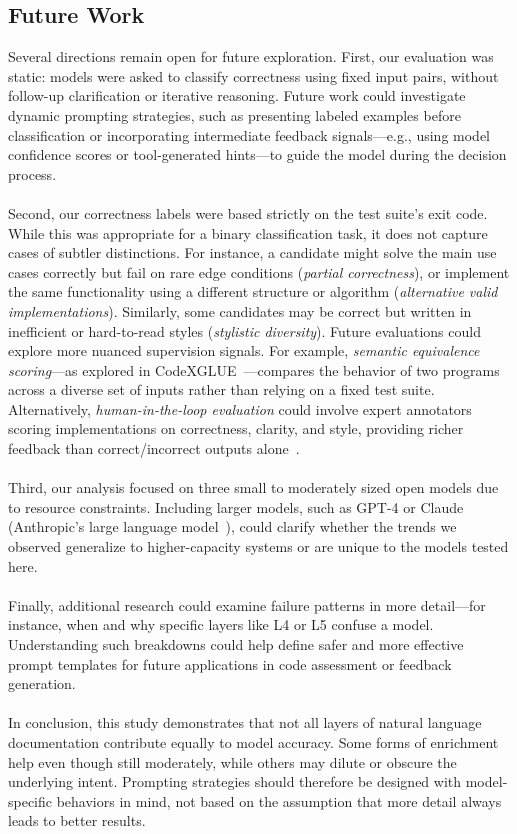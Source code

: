 \documentclass[a4paper]{usiinfbachelorproject}
\begin{document}
\subsection*{Future Work}
Several directions remain open for future exploration. First, our evaluation was static: models were asked to classify correctness using fixed input pairs, without follow-up clarification or iterative reasoning. Future work could investigate dynamic prompting strategies, such as presenting labeled examples before classification or incorporating intermediate feedback signals—e.g., using model confidence scores or tool-generated hints—to guide the model during the decision process. \\
\\
Second, our correctness labels were based strictly on the test suite’s exit code. While this was appropriate for a binary classification task, it does not capture cases of subtler distinctions. For instance, a candidate might solve the main use cases correctly but fail on rare edge conditions (\textit{partial correctness}), or implement the same functionality using a different structure or algorithm (\textit{alternative valid implementations}). Similarly, some candidates may be correct but written in inefficient or hard-to-read styles (\textit{stylistic diversity}). Future evaluations could explore more nuanced supervision signals. For example, \textit{semantic equivalence scoring}—as explored in CodeXGLUE~\cite{Lu2021codexglue}—compares the behavior of two programs across a diverse set of inputs rather than relying on a fixed test suite. Alternatively, \textit{human-in-the-loop evaluation} could involve expert annotators scoring implementations on correctness, clarity, and style, providing richer feedback than correct/incorrect outputs alone~\cite{smith2021human}. \\
\\
Third, our analysis focused on three small to moderately sized open models due to resource constraints. Including larger models, such as GPT-4 or Claude (Anthropic’s large language model~\cite{claude2023blog}), could clarify whether the trends we observed generalize to higher-capacity systems or are unique to the models tested here.\\
\\
Finally, additional research could examine failure patterns in more detail—for instance, when and why specific layers like L4 or L5 confuse a model. Understanding such breakdowns could help define safer and more effective prompt templates for future applications in code assessment or feedback generation.\\
\\
In conclusion, this study demonstrates that not all layers of natural language documentation contribute equally to model accuracy. Some forms of enrichment help even though still moderately, while others may dilute or obscure the underlying intent. Prompting strategies should therefore be designed with model-specific behaviors in mind, not based on the assumption that more detail always leads to better results.\\



\end{document}
